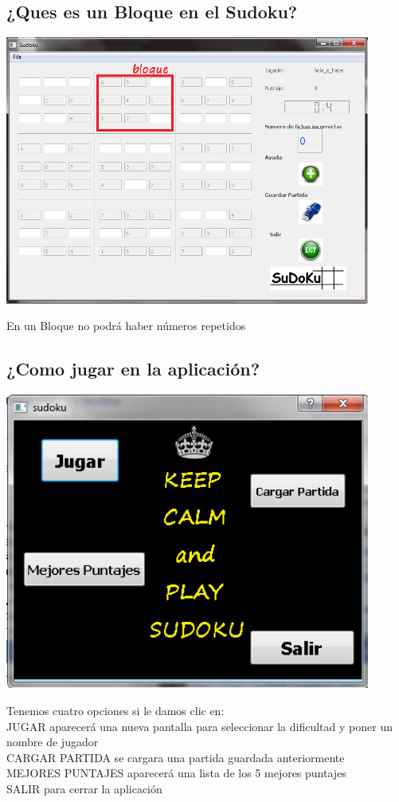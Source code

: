 \documentclass[12pt]{extbook}
\begin{document}
\begin{center}
\section{¿Ques es un Bloque en el Sudoku?}
\end{center}
\begin{center}
\includegraphics[width=12cm]{bloque.png}
\end{center}
En un Bloque no podrá haber números repetidos\\

\begin{center}
\section{¿Como jugar en la aplicación?}
\end{center}
\begin{center}
\includegraphics[width=12cm]{inicio.png}
\end{center}
Tenemos cuatro opciones si le damos clic en:\\
JUGAR aparecerá una nueva pantalla para seleccionar la dificultad y poner un nombre de jugador\\
CARGAR PARTIDA se cargara una partida guardada anteriormente\\
MEJORES PUNTAJES aparecerá una lista de los 5 mejores puntajes\\
SALIR para cerrar la aplicación\\
\end{document}
